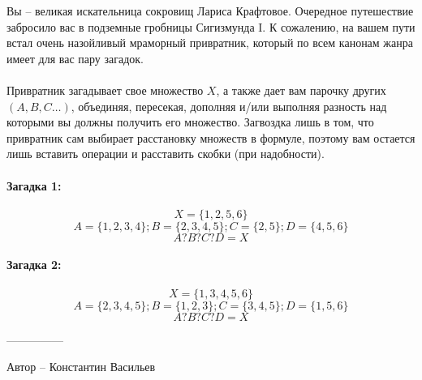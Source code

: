 \question
Вы -- великая искательница сокровищ Лариса Крафтовое. Очередное путешествие забросило вас в подземные гробницы Сигизмунда I. К сожалению, на вашем пути встал очень назойливый мраморный привратник, который по всем канонам жанра имеет для вас пару загадок.
\\
\\
Привратник загадывает свое множество $X$, а также дает вам парочку других $(A,B,C…)$, объединяя, пересекая, дополняя и/или выполняя разность над которыми вы должны получить его множество. Загвоздка лишь в том, что привратник сам выбирает расстановку множеств в формуле, поэтому вам остается лишь вставить операции и расставить скобки (при надобности).

\paragraph{Загадка 1:}
\begin{equation*}
    X=\{1,2,5,6\}
\end{equation*}
\begin{equation*}
    A=\{1,2,3,4\}; B=\{2,3,4,5\}; C=\{2,5\}; D=\{4,5,6\}
    \end{equation*}
\begin{equation*}
    A ? B ? C ? D = X
\end{equation*}

\paragraph{Загадка 2:}
\begin{equation*}
    X=\{1,3,4,5, 6\}
\end{equation*}
\begin{equation*}
    A=\{2,3,4,5\}; B=\{1,2,3\}; C=\{3,4,5\}; D=\{1,5,6\}
    \end{equation*}
\begin{equation*}
    A ? B ? C ? D = X
\end{equation*}

---------------

Автор -- Константин Васильев